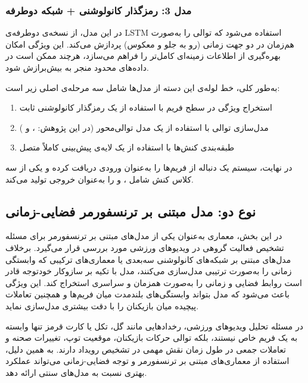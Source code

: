 \documentclass[12pt]{report}
\begin{document}
\subsubsection{مدل 3: رمزگذار کانولوشنی + شبکه  دوطرفه}
در این مدل، از نسخه‌ی دوطرفه‌ی LSTM استفاده می‌شود که توالی را به‌صورت هم‌زمان در دو جهت زمانی (رو به جلو و معکوس) پردازش می‌کند. این ویژگی امکان بهره‌گیری از اطلاعات زمینه‌ای کامل‌تر را فراهم می‌سازد، هرچند ممکن است در داده‌های محدود منجر به بیش‌برازش شود.

به‌طور کلی، خط لوله‌ی این دسته از مدل‌ها شامل سه مرحله‌ی اصلی زیر است:

\begin{enumerate}
    \item استخراج ویژگی در سطح فریم با استفاده از یک رمزگذار کانولوشنی ثابت
    \item مدل‌سازی توالی با استفاده از یک مدل توالی‌محور (در این پژوهش: ،  و )
    \item طبقه‌بندی کنش‌ها با استفاده از یک لایه‌ی پیش‌بینی کاملاً متصل
\end{enumerate}

در نهایت، سیستم یک دنباله از فریم‌ها را به‌عنوان ورودی دریافت کرده و یکی از سه کلاس کنش شامل ،  و  را به‌عنوان خروجی تولید می‌کند.

\subsection{نوع دو: مدل مبتنی بر ترنسفورمر فضایی-زمانی}

در این بخش، معماری  \cite{bertasius2021timesformer} به‌عنوان یکی از مدل‌های مبتنی بر ترنسفورمر برای مسئله تشخیص فعالیت گروهی در ویدیوهای ورزشی مورد بررسی قرار می‌گیرد. برخلاف مدل‌های مبتنی بر شبکه‌های کانولوشنی سه‌بعدی یا معماری‌های ترکیبی  که وابستگی زمانی را به‌صورت ترتیبی مدل‌سازی می‌کنند، مدل  با تکیه بر سازوکار خودتوجه قادر است روابط فضایی و زمانی را به‌صورت همزمان و سراسری استخراج کند. این ویژگی باعث می‌شود که مدل بتواند وابستگی‌های بلندمدت میان فریم‌ها و همچنین تعاملات پیچیده میان بازیکنان را با دقت بیشتری مدل‌سازی نماید.

در مسئله تحلیل ویدیوهای ورزشی، رخدادهایی مانند گل، تکل یا کارت قرمز تنها وابسته به یک فریم خاص نیستند، بلکه توالی حرکات بازیکنان، موقعیت توپ، تغییرات صحنه و تعاملات جمعی در طول زمان نقش مهمی در تشخیص رویداد دارند. به همین دلیل، استفاده از معماری‌های مبتنی بر ترنسفورمر و توجه فضایی-زمانی می‌تواند عملکرد بهتری نسبت به مدل‌های سنتی ارائه دهد.
\end{document}
